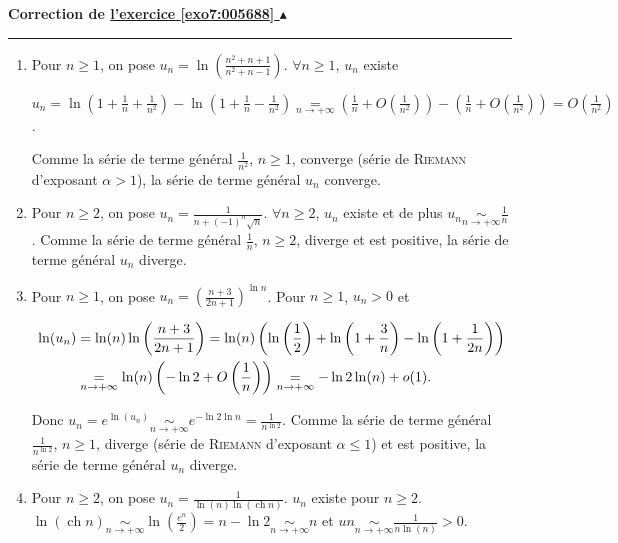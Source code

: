 \documentclass[11pt,a4paper]{article}
\newcommand{\ch}{\mathop{\mathrm{ch}}\nolimits}
\newcounter{exo}
\newcommand{\correction}[1]{\hypertarget{cor7:#1}{}\label{cor7:#1}{\bf Correction de \hyperlink{exo7:#1}{l'exercice \ref{exo7:#1} $\blacktriangle$}}\vspace{1mm}\hrule\vspace{1mm}}
\begin{document}
\correction{005688}
\begin{enumerate}
 \item  Pour $n\geqslant1$, on pose $u_n =\ln\left(\frac{n^2+n+1}{n^2+n-1}\right)$. $\forall n\geqslant 1$, $u_n$ existe

\begin{center} 
$u_n=\ln\left(1+\frac{1}{n}+\frac{1}{n^2}\right)-\ln\left(1+\frac{1}{n}-\frac{1}{n^2}\right)\underset{n\rightarrow+\infty}{=}\left(\frac{1}{n}+O\left(\frac{1}{n^2}\right)\right)-\left(\frac{1}{n}+O\left(\frac{1}{n^2}\right)\right)=O\left(\frac{1}{n^2}\right)$.
\end{center}

Comme la série de terme général $\frac{1}{n^2}$, $n\geqslant1$, converge (série de \textsc{Riemann} d'exposant $\alpha>1$), la série de terme général $u_n$ converge.

\item  Pour $n\geqslant2$, on pose $u_n =\frac{1}{n+(-1)^n\sqrt{n}}$. $\forall n\geqslant 2$, $u_n$ existe et de plus $u_n\underset{n\rightarrow+\infty}{\sim}\frac{1}{n}$. Comme la série de terme général $\frac{1}{n}$, $n\geqslant 2$, diverge et est positive, la série de terme général $u_n$ diverge.

\item  Pour $n\geqslant1$, on pose $u_n =\left(\frac{n+3}{2n+1}\right)^{\ln n}$. Pour $n\geqslant1$, $u_n > 0$ et 

\begin{align*}\ensuremath
\ln(u_n)&=\ln(n)\ln\left(\frac{n+3}{2n+1}\right) =\ln(n)\left(\ln\left(\frac{1}{2}\right)+\ln\left(1+\frac{3}{n}\right) -\ln\left(1+\frac{1}{2n}\right)\right)\\
 &\underset{n\rightarrow+\infty}{=}\ln(n)\left(-\ln2+O\left(\frac{1}{n}\right)\right)\underset{n\rightarrow+\infty}{=}-\ln2\ln(n)+o(1).
\end{align*}

Donc $u_n=e^{\ln(u_n)}\underset{n\rightarrow+\infty}{\sim}e^{-\ln2\ln n}=\frac{1}{n^{\ln2}}$.  Comme la série de terme général $\frac{1}{n^{\ln 2}}$, $n\geqslant1$, diverge (série de \textsc{Riemann} d'exposant $\alpha\leqslant1$) et est positive, la série de terme général $u_n$ diverge.

\item  Pour $n\geqslant2$, on pose $u_n=\frac{1}{\ln(n)\ln(\ch n)}$. $u_n$ existe pour $n\geqslant2$. $\ln(\ch n)\underset{n\rightarrow+\infty}{\sim}\ln\left(\frac{e^n}{2}\right)=n -\ln2\underset{n\rightarrow+\infty}{\sim}n$ et $un\underset{n\rightarrow+\infty}{\sim}\frac{1}{n\ln(n)}>0$.


\end{enumerate}
\end{document}
